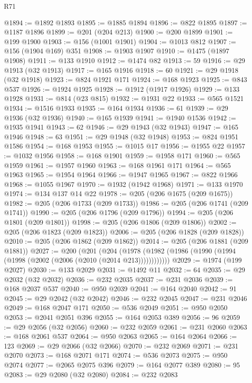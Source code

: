 \begin{lexlean}{R71}
\begin{coremodule}
@1894 := @1892 @1893
@1895 := @1885 @1894
@1896 := @822 @1895
@1897 := @1187 @1896
@1899 := @201 (@204 @213)
@1900 := @200 @1899
@1901 := @199 @1900
@1903 := @156 (@1001 @1901)
@1904 := @1013 @812
@1907 := @156 (@1904 @169) @351
@1908 := @1903 @1907
@1910 := @1475 (@1897 @1908)
@1911 := @133 @1910
@1912 := @1474 @82
@1913 := 59
@1916 := @29 @1913 (@32 @1913)
@1917 := @165 @1916
@1918 := 60
@1921 := @29 @1918 (@32 @1918)
@1923 := @824 @1921 @171
@1924 := @168 @1923
@1925 := @843 @537
@1926 := @1924 @1925
@1928 := @1912 (@1917 @1926)
@1929 := @133 @1928
@1931 := @814 (@23 @815)
@1932 := @1931 @22
@1933 := @565 @1521
@1934 := @1516 @1933
@1935 := @164 @1934
@1936 := 61
@1939 := @29 @1936 (@32 @1936)
@1940 := @165 @1939
@1941 := @1940 @1536
@1942 := @1935 @1941
@1943 := 62
@1946 := @29 @1943 (@32 @1943)
@1947 := @165 @1946
@1948 := 63
@1951 := @29 @1948 (@32 @1948)
@1953 := @824 @1951 @1586
@1954 := @168 @1953
@1955 := @1015 @17
@1956 := @1955 @22
@1957 := @1032 @1956
@1958 := @168 @1901
@1959 := @1958 @171
@1960 := @565 @1959
@1961 := @1957 @1960
@1963 := @168 @1961 @171
@1964 := @565 @1963
@1965 := @1954 @1964
@1966 := @1947 @1965
@1967 := @822 @1966
@1968 := @1055 @1967
@1970 := @1932 (@1942 @1968)
@1971 := @133 @1970
@1974 := @134 @137 @14 @22
@1978 := @205 (@206 @1675 (@209 @1675))
@1982 := @205 (@206 @1733 (@209 @1733))
@1986 := @205 (@206 @1741 (@209 @1741))
@1990 := @205 (@206 @1796 (@209 @1796))
@1994 := @205 (@206 @1801 (@209 @1801))
@1998 := @205 (@206 @1806 (@209 @1806))
@2002 := @205 (@206 @1823 (@209 @1823))
@2006 := @205 (@206 @1828 (@209 @1828))
@2010 := @205 (@206 @1862 (@209 @1862))
@2014 := @205 (@206 @1881 (@209 @1881))
@2027 := @200
    (@201
      (@204 (@1978 (@1982 (@1986 (@1990 (@1994 (@1998 (@2002 (@2006 (@2010 (@2014 @213))))))))))))
@2029 := @1974 (@199 @2027)
@2030 := @133 @2029
@2031 := @1492 @11
@2032 := 64
@2035 := @29 @2032 (@32 @2032)
@2036 := @232 @2035
@2037 := @231 @2036
@2039 := @168 @2037 @537
@2040 := @950 @2039
@2041 := @164 @2040
@2042 := 91
@2045 := @29 @2042 (@32 @2042)
@2046 := @232 @2045
@2047 := @231 @2046
@2049 := @168 @2047 @171
@2050 := @536 @2049
@2051 := @950 @2050
@2053 := @2041 @2051 @396
@2055 := @164 @2053 @389
@2056 := 96
@2059 := @29 @2056 (@32 @2056)
@2060 := @232 @2059
@2061 := @231 @2060
@2063 := @168 @2061 @537
@2064 := @950 @2063
@2065 := @164 @2064
@2066 := 123
@2069 := @29 @2066 (@32 @2066)
@2070 := @232 @2069
@2071 := @231 @2070
@2073 := @168 @2071 @171
@2074 := @536 @2073
@2075 := @950 @2074
@2077 := @2065 @2075 @396
@2079 := @164 @2077 @389
@2080 := 95
@2083 := @29 @2080 (@32 @2080)
@2084 := @232 @2083

\end{coremodule}
\end{lexlean}

